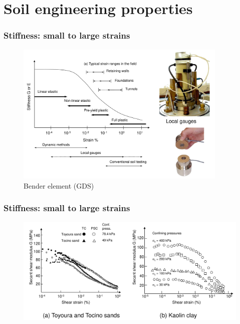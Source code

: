 \documentclass[notes]{beamer}
\begin{document}
\section{Soil engineering properties}
\begin{frame}
\frametitle{Stiffness: small to large strains}
\begin{figure}
	\includegraphics[width=0.9\textwidth]{figs/stiffness-strains.png}
	\caption*{Bender element (GDS)}
\end{figure}
\end{frame}

\begin{frame}
\frametitle{Stiffness: small to large strains}
\begin{figure}
	\includegraphics[width=\textwidth]{figs/shear-modulus.png}
\end{figure}
\end{frame}
\end{document}
